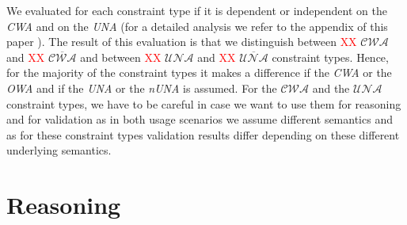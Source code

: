 \documentclass{acm_proc_article-sp}
\begin{document}
We evaluated for each constraint type 
if it is dependent or independent on the \emph{CWA} and on the \emph{UNA} (for a detailed analysis we refer to the appendix of this paper \cite{BoschNolleAcarEckert2015}). 
The result of this evaluation is that we distinguish between \textcolor{red}{XX} $\mathcal{CWA}$ and \textcolor{red}{XX} $\overline{\mathcal{CWA}}$ and between \textcolor{red}{XX} $\mathcal{UNA}$ and \textcolor{red}{XX} $\overline{\mathcal{UNA}}$ constraint types.
Hence, for the majority of the constraint types it makes a difference if the \emph{CWA} or the \emph{OWA} and if the \emph{UNA} or the \emph{nUNA} is assumed.
For the $\mathcal{CWA}$ and the $\mathcal{UNA}$ constraint types, we have to be careful in case we want to use them for reasoning and for validation
as in both usage scenarios we assume different semantics and as for these constraint types validation results differ depending on these different underlying semantics.
%
%

\section{Reasoning}
\label{reasoning}


\end{document}
